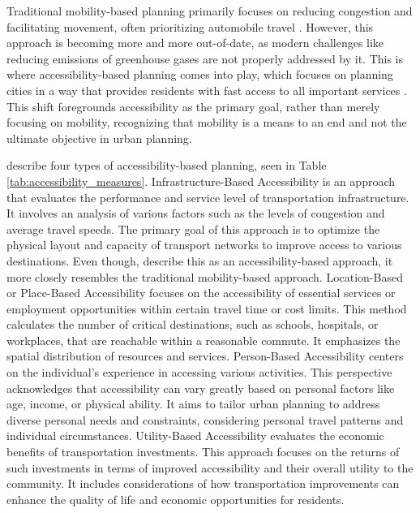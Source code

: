 Traditional mobility-based planning primarily focuses on reducing congestion and facilitating movement, often prioritizing automobile travel \cite{proffittAccessibilityPlanningAmerican2019}.
However, this approach is becoming more and more out-of-date, as modern challenges like reducing emissions of greenhouse gases are not properly addressed by it.
This is where accessibility-based planning comes into play, which focuses on planning cities in a way that provides residents with fast access to all important services \cite{proffittAccessibilityPlanningAmerican2019}.
This shift foregrounds accessibility as the primary goal, rather than merely focusing on mobility, recognizing that mobility is a means to an end and not the ultimate objective in urban planning. 

\cite{geursAccessibilityEvaluationLanduse2004a} describe four types of accessibility-based planning, seen in Table \ref{tab:accessibility_measures}.
Infrastructure-Based Accessibility is an approach that evaluates the performance and service level of transportation infrastructure.
It involves an analysis of various factors such as the levels of congestion and average travel speeds. 
The primary goal of this approach is to optimize the physical layout and capacity of transport networks to improve access to various destinations.
Even though, \cite{geursAccessibilityEvaluationLanduse2004a} describe this as an accessibility-based approach, it more closely resembles the traditional mobility-based approach.
Location-Based or Place-Based Accessibility focuses on the accessibility of essential services or employment opportunities within certain travel time or cost limits. 
This method calculates the number of critical destinations, such as schools, hospitals, or workplaces, that are reachable within a reasonable commute. It emphasizes the spatial distribution of resources and services.
Person-Based Accessibility centers on the individual’s experience in accessing various activities. This perspective acknowledges that accessibility can vary greatly based on personal factors like age, income, or physical ability. It aims to tailor urban planning to address diverse personal needs and constraints, considering personal travel patterns and individual circumstances.
Utility-Based Accessibility evaluates the economic benefits of transportation investments. 
This approach focuses on the returns of such investments in terms of improved accessibility and their overall utility to the community. 
It includes considerations of how transportation improvements can enhance the quality of life and economic opportunities for residents.


